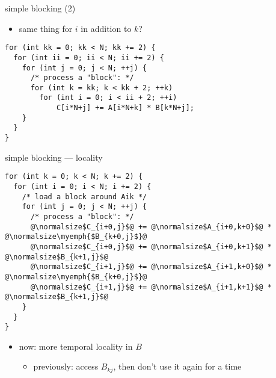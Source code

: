 

\begin{frame}[fragile,label=cacheBlockExamplePartial]{simple blocking (2)}
\begin{itemize}
\item same thing for $i$ in addition to $k$?
\end{itemize}
\begin{lstlisting}
for (int kk = 0; kk < N; kk += 2) {
  for (int ii = 0; ii < N; ii += 2) {
    for (int j = 0; j < N; ++j) {
      /* process a "block": */
      for (int k = kk; k < kk + 2; ++k)
        for (int i = 0; i < ii + 2; ++i)
            C[i*N+j] += A[i*N+k] * B[k*N+j];
    }
  }
}
\end{lstlisting}
\end{frame}

\begin{frame}[fragile,label=cacheBlockExamplePartialExpand]{simple blocking --- locality}
\lstset{style=smaller,language=C,escapechar=@}
\begin{lstlisting}
for (int k = 0; k < N; k += 2) {
  for (int i = 0; i < N; i += 2) {
    /* load a block around Aik */
    for (int j = 0; j < N; ++j) {
      /* process a "block": */
      @\normalsize$C_{i+0,j}$@ += @\normalsize$A_{i+0,k+0}$@ * @\normalsize\myemph{$B_{k+0,j}$}@
      @\normalsize$C_{i+0,j}$@ += @\normalsize$A_{i+0,k+1}$@ * @\normalsize$B_{k+1,j}$@
      @\normalsize$C_{i+1,j}$@ += @\normalsize$A_{i+1,k+0}$@ * @\normalsize\myemph{$B_{k+0,j}$}@
      @\normalsize$C_{i+1,j}$@ += @\normalsize$A_{i+1,k+1}$@ * @\normalsize$B_{k+1,j}$@
    }
  }
}
\end{lstlisting}
\begin{itemize}
\item<2-> now: more temporal locality in $B$
    \begin{itemize}
    \item previously: access $B_{kj}$, then don't use it again for a  time
    \end{itemize}
\end{itemize}
\end{frame}


